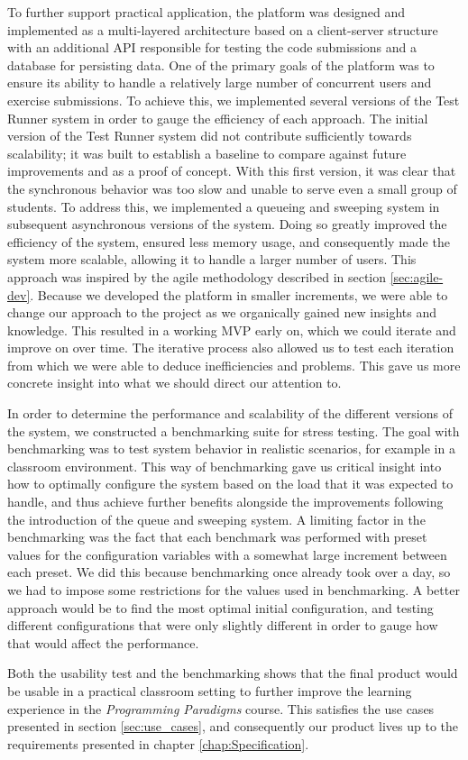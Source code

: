 To further support practical application, the platform was designed and implemented as a multi-layered architecture based on a client-server structure with an additional API responsible for testing the code submissions and a database for persisting data.
One of the primary goals of the platform was to ensure its ability to handle a relatively large number of concurrent users and exercise submissions.
To achieve this, we implemented several versions of the Test Runner system in order to gauge the efficiency of each approach.
The initial version of the Test Runner system did not contribute sufficiently towards scalability; it was built to establish a baseline to compare against future improvements and as a proof of concept.
With this first version, it was clear that the synchronous behavior was too slow and unable to serve even a small group of students.
To address this, we implemented a queueing and sweeping system in subsequent asynchronous versions of the system.
Doing so greatly improved the efficiency of the system, ensured less memory usage, and consequently made the system more scalable, allowing it to handle a larger number of users.
This approach was inspired by the agile methodology described in section \ref{sec:agile-dev}.
Because we developed the platform in smaller increments, we were able to change our approach to the project as we organically gained new insights and knowledge.
This resulted in a working MVP early on, which we could iterate and improve on over time.
The iterative process also allowed us to test each iteration from which we were able to deduce inefficiencies and problems.
This gave us more concrete insight into what we should direct our attention to.

In order to determine the performance and scalability of the different versions of the system, we constructed a benchmarking suite for stress testing.
The goal with benchmarking was to test system behavior in realistic scenarios, for example in a classroom environment.
This way of benchmarking gave us critical insight into how to optimally configure the system based on the load that it was expected to handle, and thus achieve further benefits alongside the improvements following the introduction of the queue and sweeping system.
A limiting factor in the benchmarking was the fact that each benchmark was performed with preset values for the configuration variables with a somewhat large increment between each preset.
We did this because benchmarking once already took over a day, so we had to impose some restrictions for the values used in benchmarking.
A better approach would be to find the most optimal initial configuration, and testing different configurations that were only slightly different in order to gauge how that would affect the performance.

Both the usability test and the benchmarking shows that the final product would be usable in a practical classroom setting to further improve the learning experience in the \textit{Programming Paradigms} course.
This satisfies the use cases presented in section \ref{sec:use_cases}, and consequently our product lives up to the requirements presented in chapter \ref{chap:Specification}.
